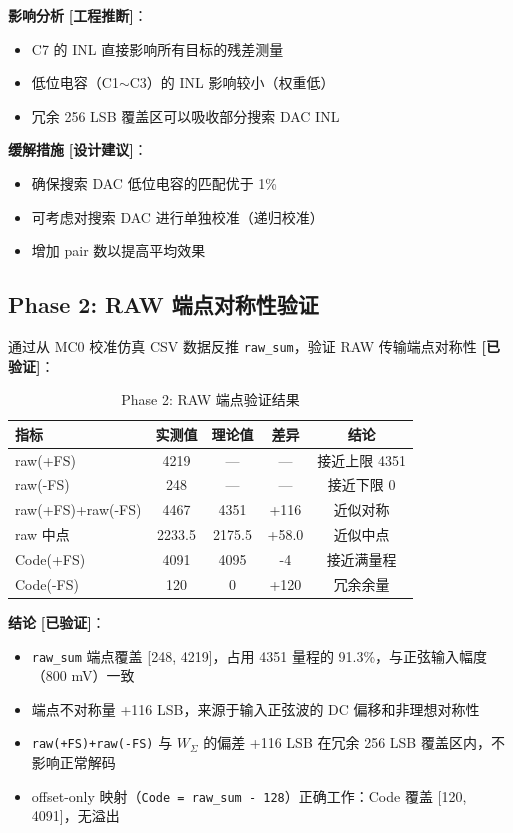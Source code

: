 \documentclass[UTF8,a4paper,11pt]{ctexart}
\newcommand{\verified}{\textcolor{verifiedgreen}{\textbf{[已验证]}}}
\newcommand{\inferred}{\textcolor{inferorange}{\textbf{[工程推断]}}}
\newcommand{\suggested}{\textcolor{suggestblue}{\textbf{[设计建议]}}}
\begin{document}
\textbf{影响分析} \inferred：
\begin{itemize}[leftmargin=2em]
\item C7 的 INL 直接影响所有目标的残差测量
\item 低位电容（C1$\sim$C3）的 INL 影响较小（权重低）
\item 冗余 256 LSB 覆盖区可以吸收部分搜索 DAC INL
\end{itemize}

\textbf{缓解措施} \suggested：
\begin{itemize}[leftmargin=2em]
\item 确保搜索 DAC 低位电容的匹配优于 1\%
\item 可考虑对搜索 DAC 进行单独校准（递归校准）
\item 增加 pair 数以提高平均效果
\end{itemize}

\subsection{Phase 2: RAW 端点对称性验证}

通过从 MC0 校准仿真 CSV 数据反推 \texttt{raw\_sum}，验证 RAW 传输端点对称性 \verified：

\begin{table}[H]
\centering
\caption{Phase 2: RAW 端点验证结果}
\label{tab:phase2_raw_endpoint}
\begin{tabular}{lcccc}
\toprule
指标 & 实测值 & 理论值 & 差异 & 结论 \\
\midrule
raw(+FS) & 4219 & — & — & 接近上限 4351 \\
raw(-FS) & 248 & — & — & 接近下限 0 \\
raw(+FS)+raw(-FS) & 4467 & 4351 & +116 & 近似对称 \\
raw 中点 & 2233.5 & 2175.5 & +58.0 & 近似中点 \\
Code(+FS) & 4091 & 4095 & -4 & 接近满量程 \\
Code(-FS) & 120 & 0 & +120 & 冗余余量 \\
\bottomrule
\end{tabular}
\end{table}

\textbf{结论} \verified：
\begin{itemize}[leftmargin=2em]
\item \texttt{raw\_sum} 端点覆盖 [248, 4219]，占用 4351 量程的 91.3\%，与正弦输入幅度（800 mV）一致
\item 端点不对称量 +116 LSB，来源于输入正弦波的 DC 偏移和非理想对称性
\item \texttt{raw(+FS)+raw(-FS)} 与 $W_\Sigma$ 的偏差 +116 LSB 在冗余 256 LSB 覆盖区内，不影响正常解码
\item offset-only 映射（\texttt{Code = raw\_sum - 128}）正确工作：Code 覆盖 [120, 4091]，无溢出
\end{itemize}
\end{document}
